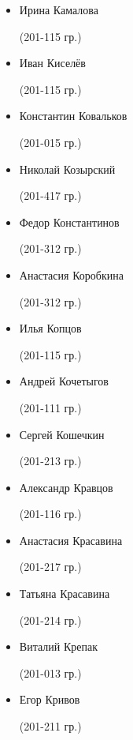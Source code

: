 \begin{multicols}{2}
\begin{small}
\begin{itemize}[leftmargin=0.5em]
	\item[] Ирина Камалова\begin{tiny} (201-115 гр.)\end{tiny}
	\item[] Иван Киселёв\begin{tiny} (201-115 гр.)\end{tiny}
	\item[] Константин Ковальков\begin{tiny} (201-015 гр.)\end{tiny}
	\item[] Николай Козырский\begin{tiny} (201-417 гр.)\end{tiny} %
	\item[] Федор Константинов\begin{tiny} (201-312 гр.)\end{tiny} %
	\item[] Анастасия Коробкина\begin{tiny} (201-312 гр.)\end{tiny} %
	\item[] Илья Копцов\begin{tiny} (201-115 гр.)\end{tiny} %
	\item[] Андрей Кочетыгов\begin{tiny} (201-111 гр.)\end{tiny} %
	\item[] Сергей Кошечкин\begin{tiny} (201-213 гр.)\end{tiny}
	\item[] Александр Кравцов\begin{tiny} (201-116 гр.)\end{tiny}
	\item[] Анастасия Красавина\begin{tiny} (201-217 гр.)\end{tiny} %
	\item[] Татьяна Красавина\begin{tiny} (201-214 гр.)\end{tiny} %
	\item[] Виталий Крепак\begin{tiny} (201-013 гр.)\end{tiny}
	\item[] Егор Кривов\begin{tiny} (201-211 гр.)\end{tiny}

\end{itemize}
\end{small}
\end{multicols}
